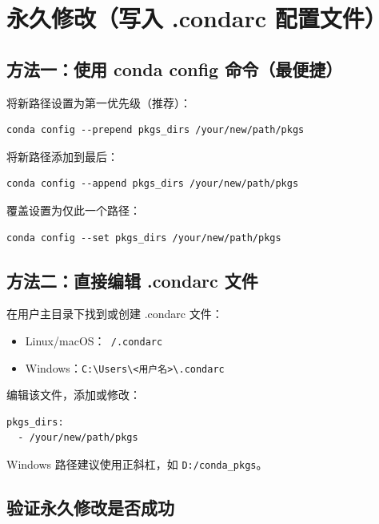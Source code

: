\documentclass[12pt,UTF8]{ctexbook}
\begin{document}
\section{永久修改（写入 .condarc 配置文件）}
\label{sec:permanent_modification}

\subsection{方法一：使用 conda config 命令（最便捷）}

将新路径设置为第一优先级（推荐）：

\begin{lstlisting}
conda config --prepend pkgs_dirs /your/new/path/pkgs
\end{lstlisting}

将新路径添加到最后：

\begin{lstlisting}
conda config --append pkgs_dirs /your/new/path/pkgs
\end{lstlisting}

覆盖设置为仅此一个路径：

\begin{lstlisting}
conda config --set pkgs_dirs /your/new/path/pkgs
\end{lstlisting}

\subsection{方法二：直接编辑 .condarc 文件}

在用户主目录下找到或创建 .condarc 文件：

\begin{itemize}[leftmargin=2cm]
    \item Linux/macOS：\texttt{~/.condarc}
    \item Windows：\texttt{C:\textbackslash Users\textbackslash <用户名>\textbackslash .condarc}
\end{itemize}

编辑该文件，添加或修改：

\begin{lstlisting}
pkgs_dirs:
  - /your/new/path/pkgs
\end{lstlisting}

Windows 路径建议使用正斜杠，如 \texttt{D:/conda\_pkgs}。

\subsection{验证永久修改是否成功}
\end{document}
